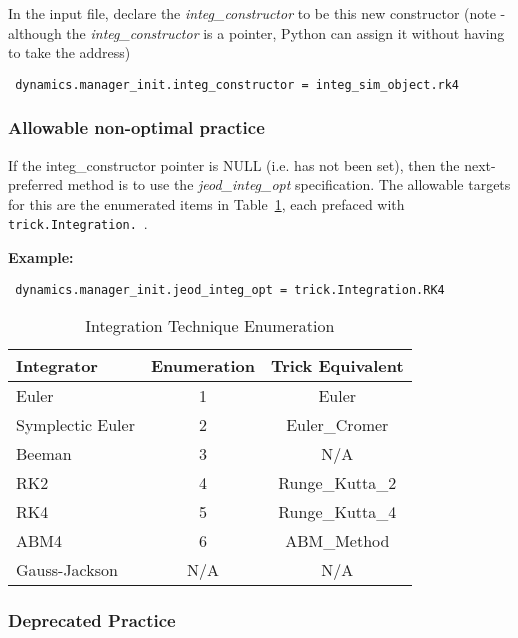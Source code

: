 \begin{enumerate}
In the input file, declare the \textit{integ\_constructor} to be this new
constructor
(note - although the \textit{integ\_constructor} is a pointer, Python can
assign it without having to take the address)

\begin{verbatim}
 dynamics.manager_init.integ_constructor = integ_sim_object.rk4
\end{verbatim}

\end{enumerate}


\subsubsection{Allowable non-optimal practice}

If the integ\_constructor pointer is NULL (i.e. has not been set), then the
next-preferred method is to use the \textit{jeod\_integ\_opt} specification.
The allowable targets for this are the enumerated items in
Table~\ref{tab:user_simdev_jeod_integ}, each prefaced with
\verb+trick.Integration.+~.

\textbf{Example:}
\begin{verbatim}
 dynamics.manager_init.jeod_integ_opt = trick.Integration.RK4
\end{verbatim}

\begin{table}[h!]
\centering
\caption{Integration Technique Enumeration}
\label{tab:user_simdev_jeod_integ}
\vspace{1ex}
\begin{tabular}{||l|c|c|}
\hline
\bf{Integrator} & {\bf Enumeration} & {\bf Trick Equivalent}
\\ \hline \hline
Euler & 1 & Euler \\
Symplectic Euler &2&Euler\_Cromer\\
Beeman &3&N/A\\
RK2 &4&Runge\_Kutta\_2\\
RK4 &5&Runge\_Kutta\_4\\
ABM4 &6&ABM\_Method\\
Gauss-Jackson &N/A&N/A \\
\hline
\end{tabular}
\end{table}

\subsubsection{Deprecated Practice}

